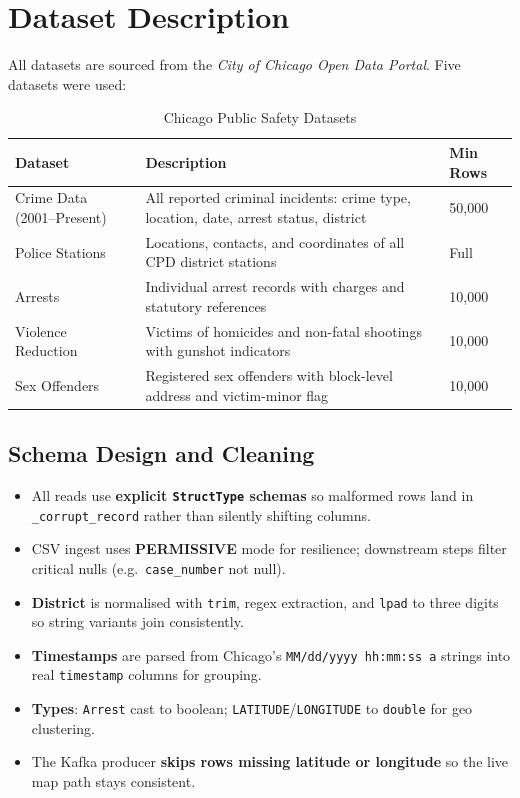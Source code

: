 \documentclass[12pt,a4paper]{article}
\begin{document}
\section{Dataset Description}

All datasets are sourced from the \textit{City of Chicago Open Data Portal}. Five datasets were used:

\begin{table}[H]
\centering
\caption{Chicago Public Safety Datasets}
\begin{tabularx}{\textwidth}{lXl}
\toprule
\textbf{Dataset} & \textbf{Description} & \textbf{Min Rows} \\
\midrule
Crime Data (2001–Present) & All reported criminal incidents: crime type, location, date, arrest status, district & 50,000 \\
Police Stations & Locations, contacts, and coordinates of all CPD district stations & Full \\
Arrests & Individual arrest records with charges and statutory references & 10,000 \\
Violence Reduction & Victims of homicides and non-fatal shootings with gunshot indicators & 10,000 \\
Sex Offenders & Registered sex offenders with block-level address and victim-minor flag & 10,000 \\
\bottomrule
\end{tabularx}
\end{table}

\subsection{Schema Design and Cleaning}

\begin{itemize}[leftmargin=1.6em]
  \item All reads use \textbf{explicit \texttt{StructType} schemas} so malformed rows land in \texttt{\_corrupt\_record} rather than silently shifting columns.
  \item CSV ingest uses \textbf{PERMISSIVE} mode for resilience; downstream steps filter critical nulls (e.g.\ \texttt{case\_number} not null).
  \item \textbf{District} is normalised with \texttt{trim}, regex extraction, and \texttt{lpad} to three digits so string variants join consistently.
  \item \textbf{Timestamps} are parsed from Chicago's \texttt{MM/dd/yyyy hh:mm:ss a} strings into real \texttt{timestamp} columns for grouping.
  \item \textbf{Types}: \texttt{Arrest} cast to boolean; \texttt{LATITUDE}/\texttt{LONGITUDE} to \texttt{double} for geo clustering.
  \item The Kafka producer \textbf{skips rows missing latitude or longitude} so the live map path stays consistent.
\end{itemize}
\end{document}
